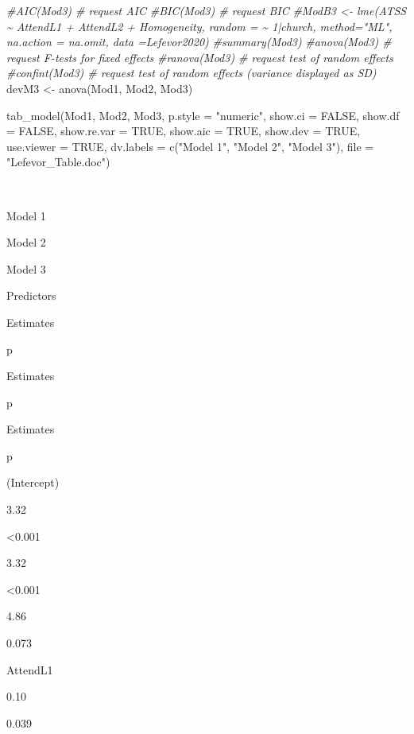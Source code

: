 \documentclass[
  english,
]{book}
\newenvironment{Shaded}{\begin{snugshade}}{\end{snugshade}}
\newcommand{\AttributeTok}[1]{\textcolor[rgb]{0.77,0.63,0.00}{#1}}
\newcommand{\CommentTok}[1]{\textcolor[rgb]{0.56,0.35,0.01}{\textit{#1}}}
\newcommand{\ConstantTok}[1]{\textcolor[rgb]{0.00,0.00,0.00}{#1}}
\newcommand{\FunctionTok}[1]{\textcolor[rgb]{0.00,0.00,0.00}{#1}}
\newcommand{\NormalTok}[1]{#1}
\newcommand{\OtherTok}[1]{\textcolor[rgb]{0.56,0.35,0.01}{#1}}
\newcommand{\StringTok}[1]{\textcolor[rgb]{0.31,0.60,0.02}{#1}}
\begin{document}
\begin{Shaded}
\begin{Highlighting}[]
\CommentTok{\#AIC(Mod3) \# request AIC}
\CommentTok{\#BIC(Mod3) \# request BIC}
\CommentTok{\#ModB3 \textless{}{-} lme(ATSS \textasciitilde{}  AttendL1 +  AttendL2 + Homogeneity, random = \textasciitilde{} 1|church, method="ML", na.action = na.omit, data =Lefevor2020)}
\CommentTok{\#summary(Mod3)}
\CommentTok{\#anova(Mod3) \# request F{-}tests for fixed effects}
\CommentTok{\#ranova(Mod3) \# request test of random effects}
\CommentTok{\#confint(Mod3) \# request test of random effects (variance displayed as SD)}
\NormalTok{devM3 }\OtherTok{\textless{}{-}} \FunctionTok{anova}\NormalTok{(Mod1, Mod2, Mod3) }

\FunctionTok{tab\_model}\NormalTok{(Mod1, Mod2, Mod3, }\AttributeTok{p.style =} \StringTok{"numeric"}\NormalTok{, }\AttributeTok{show.ci =} \ConstantTok{FALSE}\NormalTok{, }\AttributeTok{show.df =} \ConstantTok{FALSE}\NormalTok{, }\AttributeTok{show.re.var =} \ConstantTok{TRUE}\NormalTok{, }\AttributeTok{show.aic =} \ConstantTok{TRUE}\NormalTok{, }\AttributeTok{show.dev =} \ConstantTok{TRUE}\NormalTok{, }\AttributeTok{use.viewer =} \ConstantTok{TRUE}\NormalTok{, }\AttributeTok{dv.labels =} \FunctionTok{c}\NormalTok{(}\StringTok{"Model 1"}\NormalTok{, }\StringTok{"Model 2"}\NormalTok{, }\StringTok{"Model 3"}\NormalTok{), }\AttributeTok{file =} \StringTok{"Lefevor\_Table.doc"}\NormalTok{)}
\end{Highlighting}
\end{Shaded}

~

Model 1

Model 2

Model 3

Predictors

Estimates

p

Estimates

p

Estimates

p

(Intercept)

3.32

\textless0.001

3.32

\textless0.001

4.86

0.073

AttendL1

0.10

0.039
\end{document}
